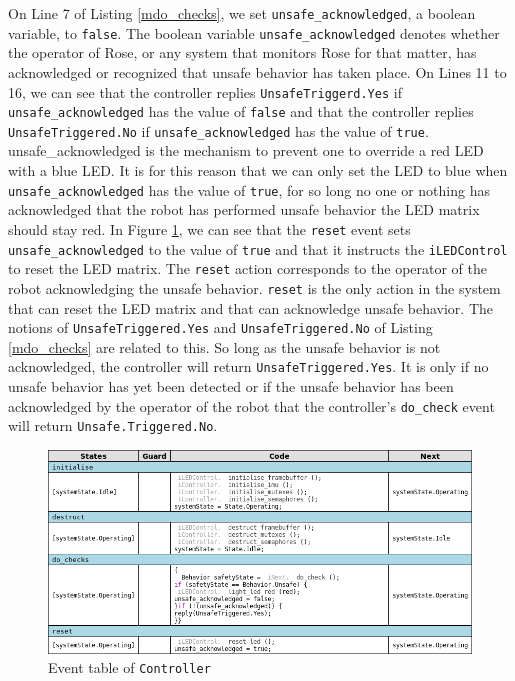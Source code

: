 \documentclass[12pt]{scrreprt}
\begin{document}
On Line 7 of Listing \ref{mdo_checks}, we set \texttt{unsafe\_acknowledged}, a boolean variable, to \texttt{false}. The boolean variable \texttt{unsafe\_acknowledged} denotes whether the operator of Rose, or any system that monitors Rose for that matter, has acknowledged or recognized that unsafe behavior has taken place. On Lines 11 to 16, we can see that the controller replies \texttt{UnsafeTriggerd.Yes} if \texttt{unsafe\_acknowledged} has the value of \texttt{false} and that the controller replies \texttt{UnsafeTriggered.No} if \texttt{unsafe\_acknowledged} has the value of \texttt{true}. {unsafe\_acknowledged} is the mechanism to prevent one to override a red LED with a blue LED. It is for this reason that we can only set the LED to blue when \texttt{unsafe\_acknowledged} has the value of \texttt{true}, for so long no one or nothing has acknowledged that the robot has performed unsafe behavior the LED matrix should stay red. In Figure \ref{fig:controll_event_table}, we can see that the \texttt{reset} event sets \texttt{unsafe\_acknowledged} to the value of \texttt{true} and that it instructs the \texttt{iLEDControl} to reset the LED matrix. The \texttt{reset} action corresponds to the operator of the robot acknowledging the unsafe behavior. \texttt{reset} is the only action in the system that can reset the LED matrix and that can acknowledge unsafe behavior. The notions of \texttt{UnsafeTriggered.Yes} and \texttt{UnsafeTriggered.No} of Listing \ref{mdo_checks} are related to this. So long as the unsafe behavior is not acknowledged, the controller will return \texttt{UnsafeTriggered.Yes}. It is only if no unsafe behavior has yet been detected or if the unsafe behavior has been acknowledged by the operator of the robot that the controller's \texttt{do\_check} event will return \texttt{Unsafe.Triggered.No}.

 \begin{figure}[H]
     \centering
     \includegraphics[width=\textwidth]{Figures/results/modelling_figures/Controller/Controller_event_table.png}
     \caption{Event table of \texttt{Controller}}
     \label{fig:controll_event_table}
 \end{figure}
 
\end{document}
